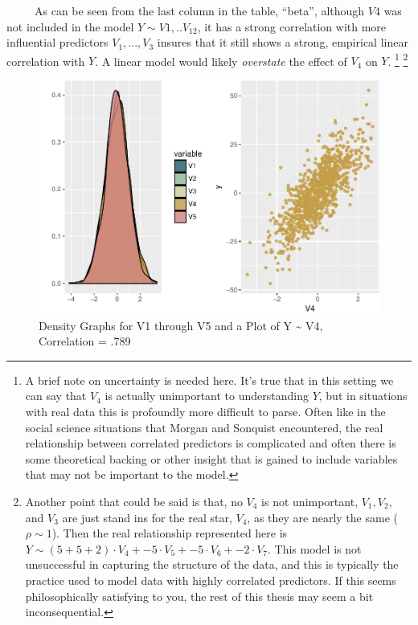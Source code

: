 \documentclass[12pt,twoside]{reedthesis}
\begin{document}
  ~~~~~As can be seen from the last column in the table, ``beta'',
  although \(V4\) was not included in the model \(Y \sim V1,..V_{12}\), it
  has a strong correlation with more influential predictors
  \(V_1,...,V_3\) insures that it still shows a strong, empirical linear
  correlation with \(Y\). A linear model would likely \emph{overstate} the
  effect of \(V_4\) on \(Y\). \footnote{A brief note on uncertainty is
    needed here. It's true that in this setting we can say that \(V_4\) is
    actually unimportant to understanding \(Y\), but in situations with
    real data this is profoundly more difficult to parse. Often like in
    the social science situations that Morgan and Sonquist encountered,
    the real relationship between correlated predictors is complicated and
    often there is some theoretical backing or other insight that is
    gained to include variables that may not be important to the model.}
  \footnote{Another point that could be said is that, no \(V_4\) is not
    unimportant, \(V_1, V_2,\) and \(V_3\) are just stand ins for the real
    star, \(V_4\), as they are nearly the same (\(\rho \sim 1\)). Then the
    real relationship represented here is
    \(Y \sim (5 + 5 + 2) \cdot V_4 + -5 \cdot V_5 + -5 \cdot V_6 + -2 \cdot V_7\).
    This model is not unsuccessful in capturing the structure of the data,
    and this is typically the practice used to model data with highly
    correlated predictors. If this seems philosophically satisfying to
    you, the rest of this thesis may seem a bit inconsequential.}
  
  \begin{figure}[htbp]
  \centering
  \includegraphics{Thesis_files/figure-latex/figdenv1v5-1.pdf}
  \caption{\label{fig:figdenv1v5}Density Graphs for V1 through V5 and a Plot
  of Y \textasciitilde{} V4, Correlation = .789}
  \end{figure}
  
\end{document}

